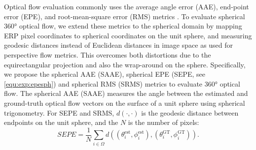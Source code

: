 Optical flow evaluation commonly uses the average angle error (AAE), end-point error (EPE), and root-mean-square error (RMS) metrics \cite{BakerSLRBS2011}.
%
To evaluate spherical 360° optical flow, we extend these metrics to the spherical domain by mapping ERP pixel coordinates to spherical coordinates on the unit sphere, and measuring geodesic distances instead of Euclidean distances in image space as used for perspective flow metrics.
This overcomes both distortions due to the equirectangular projection and also the wrap-around on the sphere.
%
%
Specifically, we propose the spherical AAE (SAAE), spherical EPE (SEPE, see \cref{equ:exp:epesph}) and spherical RMS (SRMS) metrics to evaluate 360° optical flow.
The spherical AAE (SAAE) measures the angle between the estimated and ground-truth optical flow vectors on the surface of a unit sphere using spherical trigonometry.
%
For SEPE and SRMS, $d(\cdot, \cdot)$ is the geodesic distance between endpoints on the unit sphere, and the $N$ is the number of pixels:
%
\begin{equation}\label{equ:exp:epesph}
	{SEPE} = \frac{1}{N} \sum_{i \in \Omega} d\left( (\theta^\text{est}_i, \phi^\text{est}_i), (\theta^\text{GT}_i, \phi^\text{GT}_i)\right)
	\text{.}
\end{equation}


